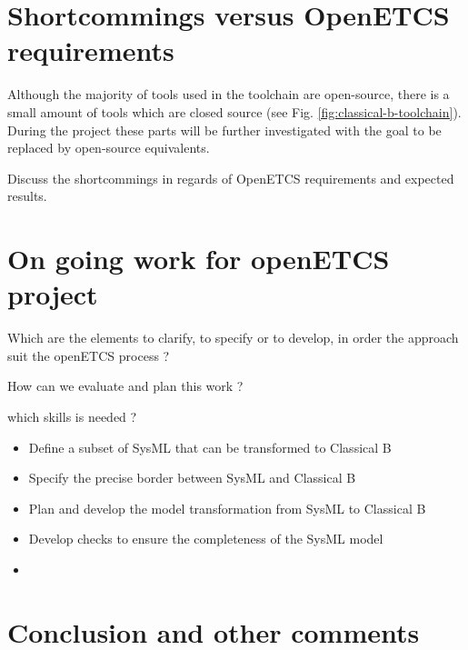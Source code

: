 \section{Shortcommings versus OpenETCS requirements}

Although the majority of tools used in the toolchain are open-source,
there is a small amount of tools which are closed source (see
Fig. \ref{fig:classical-b-toolchain}). During the project these parts
will be further investigated with the goal to be replaced by
open-source equivalents.

\begin{todo_comment}
Discuss the shortcommings in regards of OpenETCS requirements and expected results.
\end{todo_comment}

\section{On going work for openETCS project}

\begin{todo_comment}
Which are the elements to clarify, to specify or to develop, in order the approach suit the openETCS process ?

How can we evaluate and plan this work ?

which skills is needed ?
\end{todo_comment}

\begin{itemize}
\item Define a subset of SysML that can be transformed to Classical B
\item Specify the precise border between SysML and Classical B
\item Plan and develop the model transformation from SysML to Classical B
\item Develop checks to ensure the completeness of the SysML model
\item 
\end{itemize}

\section{Conclusion and other comments}
